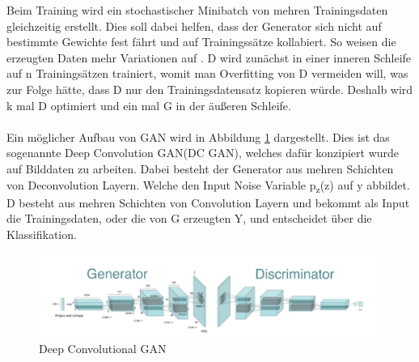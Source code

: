 \documentclass{llncs}
\begin{document}
Beim Training wird ein stochastischer Minibatch von mehren Trainingsdaten gleichzeitig erstellt. Dies soll dabei helfen, dass der Generator sich nicht auf bestimmte Gewichte fest fährt und auf Trainingssätze kollabiert. So weisen die erzeugten Daten mehr Variationen auf \cite{improvingan}. D wird zunächst in einer inneren Schleife auf n Trainingsätzen trainiert, womit man Overfitting von D vermeiden will, was zur Folge hätte, dass D nur den Trainingsdatensatz kopieren würde. Deshalb wird k mal D optimiert und ein mal G in der äußeren Schleife. 
\\\\
Ein möglicher Aufbau von GAN wird in Abbildung \ref{fig:Bild21} dargestellt. Dies ist das sogenannte Deep Convolution GAN(DC GAN), welches dafür konzipiert wurde auf Bilddaten zu arbeiten. Dabei besteht der Generator aus mehren Schichten von Deconvolution Layern. Welche den Input Noise Variable p\textsubscript{z}(z) auf y abbildet. D besteht aus mehren Schichten von Convolution Layern und bekommt als Input die Trainingsdaten, oder die von G erzeugten Y, und entscheidet über die Klassifikation\cite{dcgan}.

\begin{figure}[htbp] 
	\centering
	\includegraphics[width=1.0\textwidth]{dcgan1.png}
	\caption{Deep Convolutional GAN\protect\cite{dc-gan_book}}
	\label{fig:Bild21}
\end{figure}
\end{document}
